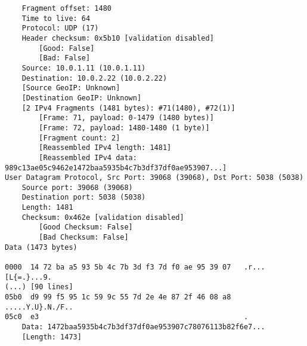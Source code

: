 \begin{lstlisting}
    Fragment offset: 1480
    Time to live: 64
    Protocol: UDP (17)
    Header checksum: 0x5b10 [validation disabled]
        [Good: False]
        [Bad: False]
    Source: 10.0.1.11 (10.0.1.11)
    Destination: 10.0.2.22 (10.0.2.22)
    [Source GeoIP: Unknown]
    [Destination GeoIP: Unknown]
    [2 IPv4 Fragments (1481 bytes): #71(1480), #72(1)]
        [Frame: 71, payload: 0-1479 (1480 bytes)]
        [Frame: 72, payload: 1480-1480 (1 byte)]
        [Fragment count: 2]
        [Reassembled IPv4 length: 1481]
        [Reassembled IPv4 data: 989c13ae05c9462e1472baa5935b4c7b3df37df0ae953907...]
User Datagram Protocol, Src Port: 39068 (39068), Dst Port: 5038 (5038)
    Source port: 39068 (39068)
    Destination port: 5038 (5038)
    Length: 1481
    Checksum: 0x462e [validation disabled]
        [Good Checksum: False]
        [Bad Checksum: False]
Data (1473 bytes)

0000  14 72 ba a5 93 5b 4c 7b 3d f3 7d f0 ae 95 39 07   .r...[L{=.}...9.
(...) [90 lines]
05b0  d9 99 f5 95 1c 59 9c 55 7d 2e 4e 87 2f 46 08 a8   .....Y.U}.N./F..
05c0  e3                                                .
    Data: 1472baa5935b4c7b3df37df0ae953907c78076113b82f6e7...
    [Length: 1473]
\end{lstlisting}


